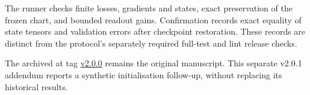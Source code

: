 \documentclass[11pt,a4paper]{article}
\begin{document}
The runner checks finite losses,
gradients and states, exact preservation of the frozen chart, and bounded
readout gains. Confirmation records exact equality of state tensors and
validation errors after checkpoint restoration. These records are
distinct from the protocol's separately required full-test and lint
release checks.

The archived  at tag
\href{https://github.com/tuned-org-uk/entropic-semantic-diffusion/tree/v2.0.0}{v2.0.0}
remains the original manuscript. This separate v2.0.1 addendum reports a
synthetic initialisation follow-up, without replacing its historical
results.
\end{document}
